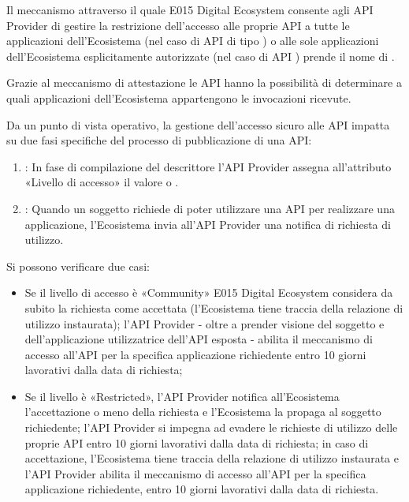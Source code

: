 \documentclass[letterpaper,10pt,italian]{sphinxmanual}
\begin{document}
Il meccanismo attraverso il quale E015 Digital Ecosystem consente agli API Provider di gestire la restrizione dell’accesso alle proprie API a tutte le applicazioni dell’Ecosistema (nel caso di API di tipo )  o alle sole applicazioni dell’Ecosistema esplicitamente autorizzate (nel caso di API ) prende il nome di .

Grazie al meccanismo di attestazione le API hanno la possibilità di determinare a quali applicazioni dell’Ecosistema appartengono le invocazioni ricevute.

Da un punto di vista operativo, la gestione dell’accesso sicuro alle API impatta su due fasi specifiche del processo di pubblicazione di una API:
\begin{enumerate}
\item {} 
: In fase di compilazione del descrittore l’API Provider assegna all’attributo «Livello di accesso» il valore  o .

\item {} 
: Quando un soggetto richiede di poter utilizzare una API per realizzare una applicazione, l’Ecosistema invia all’API Provider una notifica di richiesta di utilizzo.

\end{enumerate}

Si possono verificare due casi:
\begin{itemize}
\item {} 
Se il livello di accesso è «Community» E015 Digital Ecosystem considera da subito la richiesta come accettata (l’Ecosistema tiene traccia della relazione di utilizzo instaurata); l’API Provider - oltre a prender visione del soggetto e dell’applicazione utilizzatrice dell’API esposta - abilita il meccanismo di accesso all’API per la specifica applicazione richiedente entro 10 giorni lavorativi dalla data di richiesta;

\item {} 
Se il livello è «Restricted», l’API Provider notifica all’Ecosistema l’accettazione o meno della richiesta e l’Ecosistema la propaga al soggetto richiedente; l’API Provider si impegna ad evadere le richieste di utilizzo delle proprie API entro 10 giorni lavorativi dalla data di richiesta; in caso di accettazione, l’Ecosistema tiene traccia della relazione di utilizzo instaurata e l’API Provider abilita il meccanismo di accesso all’API per la specifica applicazione richiedente, entro 10 giorni lavorativi dalla data di richiesta.

\end{itemize}
\end{document}
